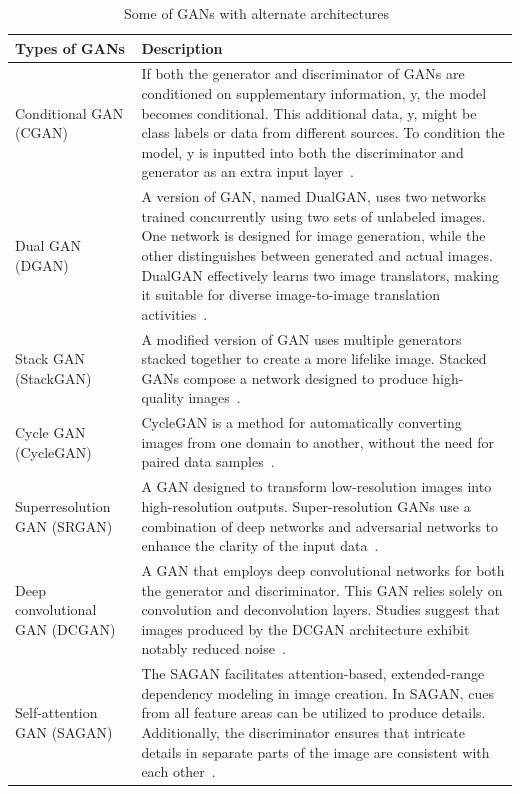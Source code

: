\begin{table}[htpb]
	\caption{Some of \ac{GAN}s with alternate architectures~\cite{gans-versions,enwiki:1169846514}}\label{tab:gans}
	\centering
	\small
	\begin{tabularx}{\textwidth}{l X}
		\toprule
		\textbf{Types of \ac{GAN}s}    & \textbf{Description}                                                \\
		\midrule
		Conditional GAN (CGAN)         & If both the generator and discriminator of
		\ac{GAN}s are conditioned on supplementary information, y, the model becomes
		conditional. This additional data, y, might be class labels or data from
		different sources. To condition the model, y is inputted
		into both the discriminator and generator as an extra input
		layer~\cite{mirza2014conditional}.                                                                   \\
		\addlinespace
		Dual GAN (DGAN)                & A version of \ac{GAN}, named DualGAN,
		uses two networks trained concurrently using two sets of unlabeled images.
		One network is designed for image generation, while the other distinguishes
		between generated and actual images. DualGAN effectively learns two image translators,
		making it suitable for diverse image-to-image translation activities~\cite{yi2018dualgan}.           \\
		\addlinespace
		Stack GAN (StackGAN)           & A modified version of \ac{GAN} uses multiple generators
		stacked together to create a more lifelike image. Stacked \ac{GAN}s compose a
		network designed to produce high-quality images~\cite{zhang2017stackgan}.                            \\
		\addlinespace
		Cycle GAN (CycleGAN)           & CycleGAN is a method for automatically converting
		images from one domain to another, without the need for paired data samples~\cite{zhu2020unpaired}.  \\
		\addlinespace
		Superresolution GAN (SRGAN)    & A \ac{GAN} designed to transform low-resolution images into
		high-resolution outputs. Super-resolution \ac{GAN}s use a combination of deep networks
		and adversarial networks to enhance the clarity of the input data~\cite{ledig2017photorealistic}.    \\
		\addlinespace
		Deep convolutional GAN (DCGAN) & A \ac{GAN} that employs deep convolutional networks
		for both the generator and discriminator. This \ac{GAN} relies solely on convolution
		and deconvolution layers. Studies suggest that images produced by the DCGAN
		architecture exhibit notably reduced noise~\cite{radford2016unsupervised}.                           \\
		\addlinespace
		Self-attention GAN (SAGAN)     & The SAGAN facilitates attention-based, extended-range
		dependency modeling in image creation. In SAGAN, cues from all feature areas can
		be utilized to produce details. Additionally, the discriminator ensures that intricate
		details in separate parts of the image are consistent with each other~\cite{zhang2019selfattention}. \\
		\bottomrule
	\end{tabularx}
\end{table}

